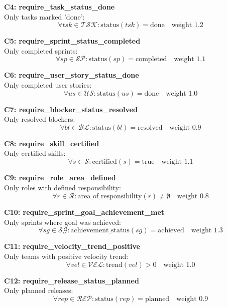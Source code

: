 \documentclass[12pt]{article}
\begin{document}
    \item \textbf{C4: require\_task\_status\_done} \\
    Only tasks marked 'done':
    \[
    \forall tsk \in \mathcal{TSK}: \text{status}(tsk) = \text{done} \quad \text{weight } 1.2
    \]

    \item \textbf{C5: require\_sprint\_status\_completed} \\
    Only completed sprints:
    \[
    \forall sp \in \mathcal{SP}: \text{status}(sp) = \text{completed} \quad \text{weight } 1.1
    \]

    \item \textbf{C6: require\_user\_story\_status\_done} \\
    Only completed user stories:
    \[
    \forall us \in \mathcal{US}: \text{status}(us) = \text{done} \quad \text{weight } 1.0
    \]

    \item \textbf{C7: require\_blocker\_status\_resolved} \\
    Only resolved blockers:
    \[
    \forall bl \in \mathcal{BL}: \text{status}(bl) = \text{resolved} \quad \text{weight } 0.9
    \]

    \item \textbf{C8: require\_skill\_certified} \\
    Only certified skills:
    \[
    \forall s \in \mathcal{S}: \text{certified}(s) = \text{true} \quad \text{weight } 1.1
    \]

    \item \textbf{C9: require\_role\_area\_defined} \\
    Only roles with defined responsibility:
    \[
    \forall r \in \mathcal{R}: \text{area\_of\_responsibility}(r) \neq \emptyset \quad \text{weight } 0.8
    \]

    \item \textbf{C10: require\_sprint\_goal\_achievement\_met} \\
    Only sprints where goal was achieved:
    \[
    \forall sg \in \mathcal{SG}: \text{achievement\_status}(sg) = \text{achieved} \quad \text{weight } 1.3
    \]

    \item \textbf{C11: require\_velocity\_trend\_positive} \\
    Only teams with positive velocity trend:
    \[
    \forall vel \in \mathcal{VEL}: \text{trend}(vel) > 0 \quad \text{weight } 1.0
    \]

    \item \textbf{C12: require\_release\_status\_planned} \\
    Only planned releases:
    \[
    \forall rep \in \mathcal{REP}: \text{status}(rep) = \text{planned} \quad \text{weight } 0.9
    \]
\end{document}
